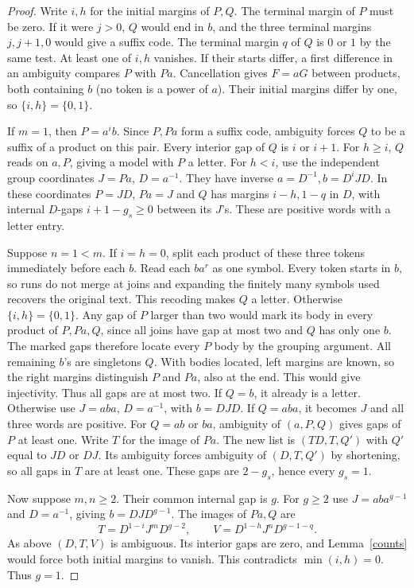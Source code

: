 \documentclass[11pt,a4paper]{article}
\begin{document}
\begin{proof}
Write $i,h$ for the initial margins of $P,Q$. The terminal margin of $P$ must be zero. If it were $j>0$, $Q$ would end in $b$, and the three terminal margins $j,j+1,0$ would give a suffix code. The terminal margin $q$ of $Q$ is $0$ or $1$ by the same test. At least one of $i,h$ vanishes. If their starts differ, a first difference in an ambiguity compares $P$ with $Pa$. Cancellation gives $F=aG$ between products, both containing $b$ (no token is a power of $a$). Their initial margins differ by one, so $\{i,h\}=\{0,1\}$.

If $m=1$, then $P=a^i b$. Since $P,Pa$ form a suffix code, ambiguity forces $Q$ to be a suffix of a product on this pair. Every interior gap of $Q$ is $i$ or $i+1$. For $h\ge i$, $Q$ reads on $a,P$, giving a model with $P$ a letter. For $h<i$, use the independent group coordinates $J=Pa$, $D=a^{-1}$. They have inverse $a=D^{-1}, b=D^i J D$. In these coordinates $P=JD$, $Pa=J$ and $Q$ has margins $i-h,1-q$ in $D$, with internal $D$-gaps $i+1-g_s\ge0$ between its $J$'s. These are positive words with a letter entry.

Suppose $n=1<m$. If $i=h=0$, split each product of these three tokens immediately before each $b$. Read each $ba^r$ as one symbol. Every token starts in $b$, so runs do not merge at joins and expanding the finitely many symbols used recovers the original text. This recoding makes $Q$ a letter. Otherwise $\{i,h\}=\{0,1\}$. Any gap of $P$ larger than two would mark its body in every product of $P,Pa,Q$, since all joins have gap at most two and $Q$ has only one $b$. The marked gaps therefore locate every $P$ body by the grouping argument. All remaining $b$'s are singletons $Q$. With bodies located, left margins are known, so the right margins distinguish $P$ and $Pa$, also at the end. This would give injectivity. Thus all gaps are at most two. If $Q=b$, it already is a letter. Otherwise use $J=aba$, $D=a^{-1}$, with $b=DJD$. If $Q=aba$, it becomes $J$ and all three words are positive. For $Q=ab$ or $ba$, ambiguity of $(a,P,Q)$ gives gaps of $P$ at least one. Write $T$ for the image of $Pa$. The new list is $(TD,T,Q')$ with $Q'$ equal to $JD$ or $DJ$. Its ambiguity forces ambiguity of $(D,T,Q')$ by shortening, so all gaps in $T$ are at least one. These gaps are $2-g_s$, hence every $g_s=1$.

Now suppose $m,n\ge2$. Their common internal gap is $g$. For $g\ge2$ use $J=aba^{g-1}$ and $D=a^{-1}$, giving $b=DJD^{g-1}$. The images of $Pa,Q$ are
\[
 T=D^{1-i}J^mD^{g-2},\qquad V=D^{1-h}J^nD^{g-1-q}.
\]
As above $(D,T,V)$ is ambiguous. Its interior gaps are zero, and Lemma~\ref{counts} would force both initial margins to vanish. This contradicts $\min(i,h)=0$. Thus $g=1$.


\end{proof}
\end{document}
